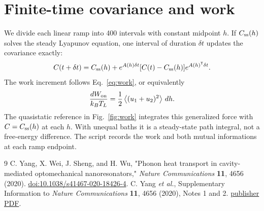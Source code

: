 \documentclass[10pt]{article}
\begin{document}
\section{Finite-time covariance and work}\label{app:dynamics}
We divide each linear ramp into 400 intervals with constant midpoint $h$. If $C_{\rm ss}(h)$ solves the steady Lyapunov equation, one interval of duration $\delta t$ updates the covariance exactly:
\begin{equation}
 C(t+\delta t)=C_{\rm ss}(h)
 +e^{A(h)\delta t}[C(t)-C_{\rm ss}(h)]e^{A(h)^{\mathsf T}\delta t}.
\end{equation}
The work increment follows Eq.~\eqref{eq:work}, or equivalently
\begin{equation}
 \frac{dW_{\rm on}}{k_BT_L}
 =\frac12\left\langle(u_1+u_2)^2\right\rangle\,dh .
\end{equation}
The quasistatic reference in Fig.~\ref{fig:work} integrates this generalized force with $C=C_{\rm ss}(h)$ at each $h$. With unequal baths it is a steady-state path integral, not a free-energy difference. The script records the work and both mutual informations at each ramp endpoint.

\begin{thebibliography}{9}
 C. Yang, X. Wei, J. Sheng, and H. Wu, "Phonon heat transport in cavity-mediated optomechanical nanoresonators," \emph{Nature Communications} \textbf{11}, 4656 (2020). \href{https://doi.org/10.1038/s41467-020-18426-4}{doi:10.1038/s41467-020-18426-4}.
 C. Yang \emph{et al.}, Supplementary Information to \emph{Nature Communications} \textbf{11}, 4656 (2020), Notes 1 and 2. \href{https://media.springernature.com/original/springer-static/esm/art%3A10.1038%2Fs41467-020-18426-4/MediaObjects/41467_2020_18426_MOESM1_ESM.pdf}{publisher PDF}.
\end{thebibliography}
\end{document}

